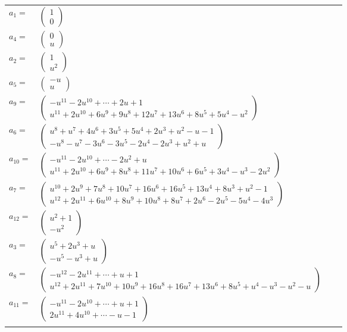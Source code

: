 \documentclass[1p]{elsarticle_modified}
\theoremstyle{definition}
\begin{document}
\begin{tabular}{m{7pt} m{180pt} m{7pt} m{180pt} }
\flushright $a_{1}=$&$\begin{pmatrix}1\\0\end{pmatrix}$ \\
\flushright $a_{4}=$&$\begin{pmatrix}0\\u\end{pmatrix}$ \\
\flushright $a_{2}=$&$\begin{pmatrix}1\\u^2\end{pmatrix}$ \\
\flushright $a_{5}=$&$\begin{pmatrix}- u\\u\end{pmatrix}$ \\
\flushright $a_{9}=$&$\begin{pmatrix}- u^{11}-2 u^{10}+\cdots+2 u+1\\u^{11}+2 u^{10}+6 u^9+9 u^8+12 u^7+13 u^6+8 u^5+5 u^4- u^2\end{pmatrix}$ \\
\flushright $a_{6}=$&$\begin{pmatrix}u^8+u^7+4 u^6+3 u^5+5 u^4+2 u^3+u^2- u-1\\- u^8- u^7-3 u^6-3 u^5-2 u^4-2 u^3+u^2+u\end{pmatrix}$ \\
\flushright $a_{10}=$&$\begin{pmatrix}- u^{11}-2 u^{10}+\cdots-2 u^2+u\\u^{11}+2 u^{10}+6 u^9+8 u^8+11 u^7+10 u^6+6 u^5+3 u^4- u^3-2 u^2\end{pmatrix}$ \\
\flushright $a_{7}=$&$\begin{pmatrix}u^{10}+2 u^9+7 u^8+10 u^7+16 u^6+16 u^5+13 u^4+8 u^3+u^2-1\\u^{12}+2 u^{11}+6 u^{10}+8 u^9+10 u^8+8 u^7+2 u^6-2 u^5-5 u^4-4 u^3\end{pmatrix}$ \\
\flushright $a_{12}=$&$\begin{pmatrix}u^2+1\\- u^2\end{pmatrix}$ \\
\flushright $a_{3}=$&$\begin{pmatrix}u^5+2 u^3+u\\- u^5- u^3+u\end{pmatrix}$ \\
\flushright $a_{8}=$&$\begin{pmatrix}- u^{12}-2 u^{11}+\cdots+u+1\\u^{12}+2 u^{11}+7 u^{10}+10 u^9+16 u^8+16 u^7+13 u^6+8 u^5+u^4- u^3- u^2- u\end{pmatrix}$ \\
\flushright $a_{11}=$&$\begin{pmatrix}- u^{11}-2 u^{10}+\cdots+u+1\\2 u^{11}+4 u^{10}+\cdots- u-1\end{pmatrix}$\\&\end{tabular}
\end{document}
